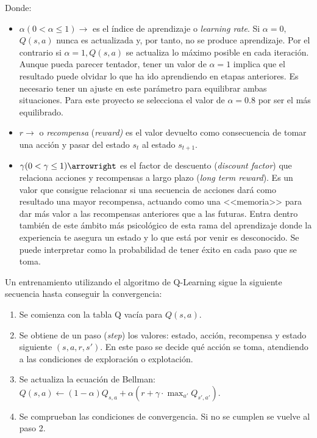 Donde:\\
\begin{itemize}
    \item $\alpha (0 < \alpha \leq 1) \rightarrow$ es el índice de aprendizaje o \textit{learning rate}. Si $\alpha = 0,$ $Q(s, a)$ nunca es actualizada y, por tanto, no se produce aprendizaje. Por el contrario si $\alpha = 1, Q(s,a)$ se actualiza lo máximo posible en cada iteración. Aunque pueda parecer tentador, tener un valor de $\alpha = 1$ implica que el resultado puede olvidar lo que ha ido aprendiendo en etapas anteriores. Es necesario tener un ajuste en este parámetro para equilibrar ambas situaciones. Para este proyecto se selecciona el valor de $\alpha = 0.8$ por ser el más equilibrado.\\
    \item $r \rightarrow$ o \textit{recompensa} (\textit{reward)} es el valor devuelto como consecuencia de tomar una acción y pasar del estado $s_t$ al estado $s_{t+1}$.\\
    \item $\gamma (0 < \gamma \leq 1) \arrowright$ es el factor de descuento (\textit{discount factor}) que relaciona acciones y recompensas a largo plazo (\textit{long term reward}). Es un valor que consigue relacionar si una secuencia de acciones dará como resultado una mayor recompensa, actuando como una <<memoria>> para dar más valor a las recompensas anteriores que a las futuras. Entra dentro también de este ámbito más psicológico de esta rama del aprendizaje donde la experiencia te asegura un estado y lo que está por venir es desconocido. Se puede interpretar como la probabilidad de tener éxito en cada paso que se toma.\\
\end{itemize}

Un entrenamiento utilizando el algoritmo de Q-Learning sigue la siguiente secuencia hasta conseguir la convergencia:\\

\begin{enumerate}
    \item Se comienza con la tabla Q vacía para $Q(s,a)$.\\
    \item Se obtiene de un paso (\textit{step}) los valores: estado, acción, recompensa y estado siguiente $(s, a, r, s')$. En este paso se decide qué acción se toma, atendiendo a las condiciones de exploración o explotación.\\
    \item Se actualiza la ecuación de Bellman: $Q(s,a) \leftarrow (1 - \alpha) Q_{s,a} + \alpha(r + \gamma \cdot \max_{a'}Q_{s',a'})$.\\
    \item Se comprueban las condiciones de convergencia. Si no se cumplen se vuelve al paso 2.\\
\end{enumerate}


